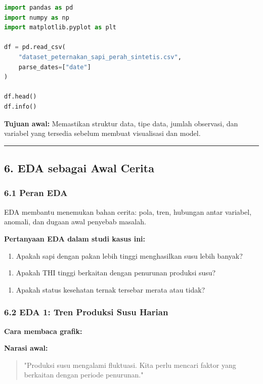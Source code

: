 \documentclass[12pt,a4paper]{article}
\begin{document}
\begin{lstlisting}[language=Python]
import pandas as pd
import numpy as np
import matplotlib.pyplot as plt

df = pd.read_csv(
    "dataset_peternakan_sapi_perah_sintetis.csv",
    parse_dates=["date"]
)

df.head()
df.info()
\end{lstlisting}

\textbf{Tujuan awal:} Memastikan struktur data, tipe data, jumlah observasi, dan variabel yang tersedia sebelum membuat visualisasi dan model.


\hrule


\subsection{6. EDA sebagai Awal Cerita}

\subsubsection{6.1 Peran EDA}

EDA membantu menemukan bahan cerita: pola, tren, hubungan antar variabel, anomali, dan dugaan awal penyebab masalah.


\textbf{Pertanyaan EDA dalam studi kasus ini:}


\begin{enumerate}
\item Apakah sapi dengan pakan lebih tinggi menghasilkan susu lebih banyak?
\end{enumerate}

\begin{enumerate}
\item Apakah THI tinggi berkaitan dengan penurunan produksi susu?
\end{enumerate}

\begin{enumerate}
\item Apakah status kesehatan ternak tersebar merata atau tidak?
\end{enumerate}


\subsubsection{6.2 EDA 1: Tren Produksi Susu Harian}

\textbf{Cara membaca grafik:}


\textbf{Narasi awal:}


\begin{quote}
"Produksi susu mengalami fluktuasi. Kita perlu mencari faktor yang berkaitan dengan periode penurunan."\end{quote}
\end{document}
